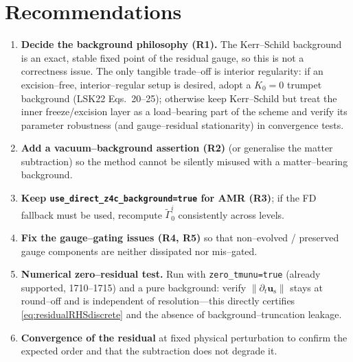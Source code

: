 \documentclass[11pt]{article}
\newcommand{\code}[1]{\texttt{#1}}
\newcommand{\Gamt}{\tilde\Gamma}
\newcommand{\bg}[1]{#1_{0}}
\newcommand{\res}[1]{#1_{\mathrm s}}
\begin{document}
\section{Recommendations}
\begin{enumerate}[leftmargin=1.6em,itemsep=2pt]
\item \textbf{Decide the background philosophy (R1).} The Kerr--Schild
background is an exact, stable fixed point of the residual gauge, so this is not
a correctness issue. The only tangible trade--off is interior regularity: if an
excision--free, interior--regular setup is desired, adopt a $K_0=0$ trumpet
background (LSK22 Eqs.~20--25); otherwise keep Kerr--Schild but treat the inner
freeze/excision layer as a load--bearing part of the scheme and verify its
parameter robustness (and gauge--residual stationarity) in convergence tests.
\item \textbf{Add a vacuum--background assertion (R2)} (or generalise the
matter subtraction) so the method cannot be silently misused with a
matter--bearing background.
\item \textbf{Keep \code{use\_direct\_z4c\_background=true} for AMR (R3)}; if
the FD fallback must be used, recompute $\bg{\Gamt}^i$ consistently across
levels.
\item \textbf{Fix the gauge--gating issues (R4, R5)} so that non--evolved /
preserved gauge components are neither dissipated nor mis--gated.
\item \textbf{Numerical zero--residual test.} Run with
\code{zero\_tmunu=true} (already supported, 1710--1715) and a pure background:
verify $\|\partial_t\res{\bm u}\|$ stays at round--off and is independent of
resolution---this directly certifies \eqref{eq:residualRHSdiscrete} and the
absence of background--truncation leakage.
\item \textbf{Convergence of the residual} at fixed physical perturbation to
confirm the expected order and that the subtraction does not degrade it.
\end{enumerate}

\end{document}
